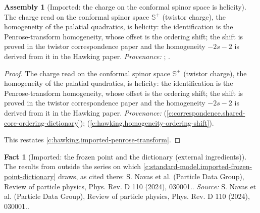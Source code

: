 \documentclass[11pt]{article}
\theoremstyle{definition}
\newtheorem{fact}[theorem]{Fact}
\newtheorem{assembled}[theorem]{Assembly}
\theoremstyle{plain}
\newcommand{\changedmark}[2]{\marginpar{\raggedright\scriptsize\color{#1}#2}}
\providecommand{\CS}{}\renewcommand{\CS}{{\mathbb{S}^{+}}}
\begin{document}
\begin{assembled}[Imported: the charge on the conformal spinor space is helicity]\label{c:standard-model.imported-twistor-charge-helicity}
\changedmark{gray}{reworded}
The charge read on the conformal spinor space $\CS$ (twistor charge), the homogeneity of the palatial quadratics, is helicity: the identification is the Penrose-transform homogeneity, whose offset is the ordering shift; the shift is proved in the twistor correspondence paper and the homogeneity $-2s-2$ is derived from it in the Hawking paper. \emph{Provenance:} \cite[Thm.~5.7]{ButlerT9}; \cite[Prop.~5.2]{ButlerT7}.
\end{assembled}
\begin{proof}
The charge read on the conformal spinor space $\CS$ (twistor charge), the homogeneity of the palatial quadratics, is helicity: the identification is the Penrose-transform homogeneity, whose offset is the ordering shift; the shift is proved in the twistor correspondence paper and the homogeneity $-2s-2$ is derived from it in the Hawking paper. \emph{Provenance:} \cite[Thm.~5.7]{ButlerT9} (\ref{c:correspondence.shared-core-ordering-dictionary}); \cite[Prop.~5.2]{ButlerT7} (\ref{c:hawking.homogeneity-ordering-shift}).

This restates \ref{c:hawking.imported-penrose-transform}.

\end{proof}

\begin{fact}[Imported: the frozen point and the dictionary (external ingredients)]\label{c:standard-model.imported-frozen-point-dictionary-external}
The results from outside the series on which \ref{c:standard-model.imported-frozen-point-dictionary} draws, as cited there: S. Navas et al. (Particle Data Group), Review of particle physics, Phys. Rev. D 110 (2024), 030001..
\emph{Source:} S. Navas et al. (Particle Data Group), Review of particle physics, Phys. Rev. D 110 (2024), 030001..
\end{fact}
\end{document}
